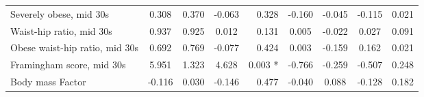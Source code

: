 \begin{tabular}{l c c c r c c c r}
Severely obese, mid 30s & 0.308 & 0.370 & -0.063 & 0.328 & -0.160 & -0.045 & -0.115 & 0.021 \\
Waist-hip ratio, mid 30s & 0.937 & 0.925 & 0.012 & 0.131 & 0.005 & -0.022 & 0.027 & 0.091 \\
Obese waist-hip ratio, mid 30s & 0.692 & 0.769 & -0.077 & 0.424 & 0.003 & -0.159 & 0.162 & 0.021 \\
Framingham score, mid 30s & 5.951 & 1.323 & 4.628 & 0.003 * & -0.766 & -0.259 & -0.507 & 0.248 \\
Body mass Factor & -0.116 & 0.030 & -0.146 & 0.477 & -0.040 & 0.088 & -0.128 & 0.182 \\
\bottomrule
\end{tabular}
